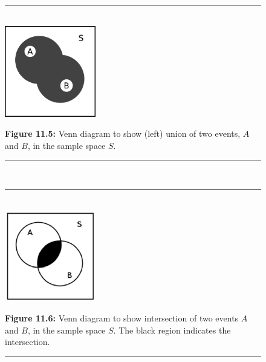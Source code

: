     \setcounter{subfigure}{0}
	\begin{figure}[H] %
    \begin{center}
    \rule[.1in]{\figurerulewidth}{.005in} \\
        \label{m39377*uid13!!!underscore!!!media}\label{m39377*uid13!!!underscore!!!printimage}\includegraphics[width=150px]{col11306.imgs/m39377_union.png} %
      \vspace{2pt}
    \vspace{\rubberspace}\par \begin{cnxcaption}
	  \small \textbf{Figure 11.5: }Venn diagram to show (left) union of two events, $A$ and $B$, in the sample space $S$.
	\end{cnxcaption}
    \vspace{.1in}
    \rule[.1in]{\figurerulewidth}{.005in} \\
    \end{center}
 \end{figure}       
    \setcounter{subfigure}{0}
	\begin{figure}[H] %
    \begin{center}
    \rule[.1in]{\figurerulewidth}{.005in} \\
        \label{m39377*uid1381!!!underscore!!!media}\label{m39377*uid1381!!!underscore!!!printimage}\includegraphics[width=150px]{col11306.imgs/m39377_intersect.png} %
      \vspace{2pt}
    \vspace{\rubberspace}\par \begin{cnxcaption}
	  \small \textbf{Figure 11.6: }Venn diagram to show intersection of two events
$A$ and $B$, in the sample space $S$. The black region indicates the
intersection.
	\end{cnxcaption}
    \vspace{.1in}
    \rule[.1in]{\figurerulewidth}{.005in} \\
    \end{center}
 \end{figure}       
